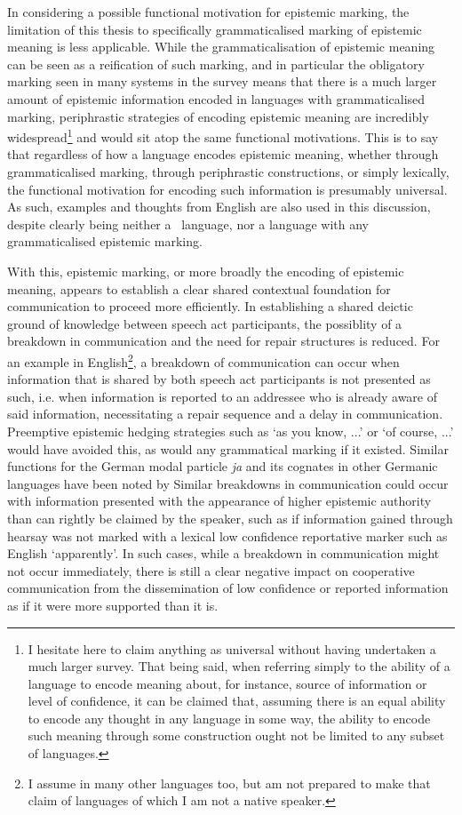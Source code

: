 In considering a possible functional motivation for epistemic marking, the limitation of this thesis to specifically grammaticalised marking of epistemic meaning is less applicable. While the grammaticalisation of epistemic meaning can be seen as a reification of such marking, and in particular the obligatory marking seen in many systems in the survey means that there is a much larger amount of epistemic information encoded in languages with grammaticalised marking, periphrastic strategies of encoding epistemic meaning are incredibly widespread\footnote{I hesitate here to claim anything as universal without having undertaken a much larger survey. That being said, when referring simply to the ability of a language to encode meaning about, for instance, source of information or level of confidence, it can be claimed that, assuming there is an equal ability to encode any thought in any language in some way, the ability to encode such meaning through some construction ought not be limited to any subset of languages.} and would sit atop the same functional motivations. This is to say that regardless of how a language encodes epistemic meaning, whether through grammaticalised marking, through periphrastic constructions, or simply lexically, the functional motivation for encoding such information is presumably universal. As such, examples and thoughts from English are also used in this discussion, despite clearly being neither a \lfam\ language, nor a language with any grammaticalised epistemic marking.

With this, epistemic marking, or more broadly the encoding of epistemic meaning, appears to establish a clear shared contextual foundation for communication to proceed more efficiently. In establishing a shared deictic ground of knowledge between speech act participants, the possiblity of a breakdown in communication and the need for repair structures is reduced. For an example in English\footnote{I assume in many other languages too, but am not prepared to make that claim of languages of which I am not a native speaker.}, a breakdown of communication can occur when information that is shared by both speech act participants is not presented as such, i.e. when information is reported to an addressee who is already aware of said information, necessitating a repair sequence and a delay in communication. Preemptive epistemic hedging strategies such as `as you know, ...' or `of course, ...' would have avoided this, as would any grammatical marking if it existed. Similar functions for the German modal particle \textit{ja} and its cognates in other Germanic languages have been noted by  Similar breakdowns in communication could occur with information presented with the appearance of higher epistemic authority than can rightly be claimed by the speaker, such as if information gained through hearsay was not marked with a lexical low confidence reportative marker such as English `apparently'. In such cases, while a breakdown in communication might not occur immediately, there is still a clear negative impact on cooperative communication from the dissemination of low confidence or reported information as if it were more supported than it is.

